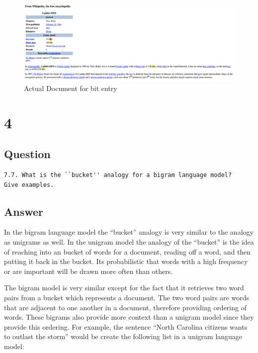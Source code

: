 \documentclass[letterpaper,11pt]{article}
\begin{document}
\begin{figure}[h]
\centering
\includegraphics[scale=0.4]{g3.png}
\caption{Actual Document for bit entry}
\label{fig:g32}
\end{figure}

\clearpage



\section*{4}

\subsection*{Question}

\begin{verbatim}
7.7. What is the ``bucket'' analogy for a bigram language model?
Give examples.
\end{verbatim}

\subsection*{Answer}

In the bigram language model the ``bucket'' analogy is very similar to the analogy as unigrams as well.
In the unigram model the analogy of the ``bucket'' is the idea of reaching into an bucket of words for a document, reading off a word, and then putting it back in the bucket.
Its probabilistic that words with a high frequency or are important will be drawn more often than others.

The bigram model is very similar except for the fact that it retrieves two word pairs from a bucket which represents a document.
The two word pairs are words that are adjacent to one another in a document, therefore providing ordering of words.
These bigrams also provide more context than a unigram model since they provide this ordering. 
For example, the sentence ``North Carolina citizens wants to outlast the storm'' would be create the following list in a unigram language model:
\end{document}
